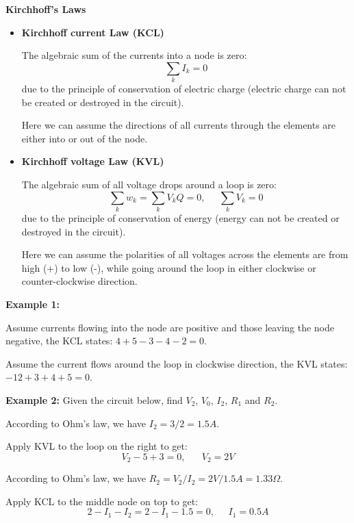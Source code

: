 \documentclass{article}
\begin{document}
{\bf Kirchhoff's Laws}
\begin{itemize}
\item {\bf Kirchhoff current Law (KCL)} 

  The algebraic sum of the currents into a node is zero:
  \begin{equation}
    \sum_k I_k=0	
  \end{equation}
  due to the principle of conservation of electric charge (electric
  charge can not be created or destroyed in the circuit).  

  Here we can assume the directions of all currents through the elements
  are either into or out of the node.

\item {\bf Kirchhoff voltage Law (KVL)} 

  The algebraic sum of all voltage drops around a loop is zero:
  \begin{equation} 
    \sum_k w_k=\sum_k V_k Q=0,\;\;\;\;\;  \sum_k V_k=0	
  \end{equation}
  due to the principle of conservation of energy (energy can not be
  created or destroyed in the circuit).
  
  Here we can assume the polarities of all voltages across the elements
  are from high (+) to low (-), while going around the loop in either 
  clockwise or counter-clockwise direction.
\end{itemize}

{\bf Example 1:}


Assume currents flowing into the node are positive and those leaving the 
node negative, the KCL states: $4+5-3-4-2=0$. 

Assume the current flows around the loop in clockwise direction, the KVL
states: $-12+3+4+5=0$. 

{\bf Example 2:}  Given the circuit below, find $V_2$, $V_0$, $I_2$, $R_1$
and $R_2$.


According to Ohm's law, we have $I_2=3/2=1.5A$.  

Apply KVL to the loop on the right to get:
\begin{equation} 
  V_2-5+3=0,\;\;\;\;\;\; V_2=2V 
\end{equation}

According to Ohm's law, we have $R_2=V_2/I_2=2V/1.5A=1.33\Omega$.

Apply KCL to the middle node on top to get:
\begin{equation}
  2-I_1-I_2=2-I_1-1.5=0,\;\;\;\;\;I_1=0.5A 
\end{equation}
\end{document}
